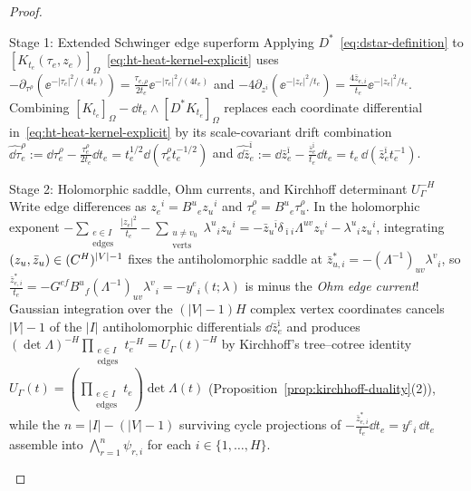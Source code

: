\begin{proof}\leavevmode
\begin{proofpart}{Stage 1: Extended Schwinger edge superform}
Applying $D^*$~\eqref{eq:dstar-definition} to $[K_{t_e}(\tau_e,z_e)]_\Omega$~\eqref{eq:ht-heat-kernel-explicit} uses $-\partial_{\tau^\rho}(\ee^{-|\tau_e|^2/(4t_e)}) = \frac{\tau_{e,\rho}}{2t_e}\ee^{-|\tau_e|^2/(4t_e)}$ and $-4\partial_{z^i}(\ee^{-|z_e|^2/t_e}) = \frac{4\bar{z}_{e,i}}{t_e}\ee^{-|z_e|^2/t_e}$. Combining $[K_{t_e}]_\Omega - \dd t_e\wedge[D^* K_{t_e}]_\Omega$ replaces each coordinate differential in~\eqref{eq:ht-heat-kernel-explicit} by its scale-covariant drift combination $\widehat{\dd\tau}_e^\rho := \dd\tau_e^\rho - \frac{\tau_e^\rho}{2t_e}\dd t_e = t_e^{1/2}\dd(\tau_e^\rho t_e^{-1/2})$ and $\widehat{\dd\bar{z}}_e^{\bar{\imath}} := \dd\bar{z}_e^{\bar{\imath}} - \frac{\bar{z}_e^{\bar{\imath}}}{t_e}\dd t_e = t_e\,\dd(\bar{z}_e^{\bar{\imath}}t_e^{-1})$.
\end{proofpart}
\begin{proofpart}{Stage 2: Holomorphic saddle, Ohm currents, and Kirchhoff determinant $U_\Gamma^{-H}$}
Write edge differences as $z_e{}^i = B^u{}_e z_u{}^i$ and $\tau_e^\rho = B^u{}_e\tau_u^\rho$. In the holomorphic exponent $-\sum_{\substack{e\in I\\\mathrm{edges}}}\frac{|z_e|^2}{t_e} - \sum_{\substack{u\neq v_0\\\mathrm{verts}}}\lambda^u{}_i z_u{}^i = -\bar{z}_u{}^{\bar{\imath}}\delta_{\bar{\imath}i}\Lambda^{uv}z_v{}^i - \lambda^u{}_i z_u{}^i$, integrating $(z_u,\bar{z}_u) \in (C^H)^{|V|-1}$ fixes the antiholomorphic saddle at $\bar{z}_{u,i}^* = -(\Lambda^{-1})_{uv}\lambda^v{}_i$, so $\frac{\bar{z}_{e,i}^*}{t_e} = -G^{ef}B^u{}_f(\Lambda^{-1})_{uv}\lambda^v{}_i = -y^e{}_i(t;\lambda)$ is minus the \emph{Ohm edge current}! Gaussian integration over the $(|V|-1)H$ complex vertex coordinates cancels $|V|-1$ of the $|I|$ antiholomorphic differentials $\dd\bar{z}_e^{\bar{\imath}}$ and produces $(\det\Lambda)^{-H}\prod_{\substack{e\in I\\\mathrm{edges}}}t_e^{-H} = U_\Gamma(t)^{-H}$ by Kirchhoff's tree--cotree identity $U_\Gamma(t) = (\prod_{\substack{e\in I\\\mathrm{edges}}}t_e)\det\Lambda(t)$ (Proposition~\ref{prop:kirchhoff-duality}(2)), while the $n = |I|-(|V|-1)$ surviving cycle projections of $-\frac{\bar{z}_{e,i}^*}{t_e}\dd t_e = y^e{}_i\,\dd t_e$ assemble into $\bigwedge_{r=1}^n\psi_{r,i}$ for each $i \in \{1,\dots,H\}$.
\end{proofpart}

\end{proof}
